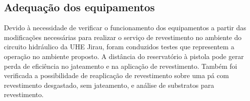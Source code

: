 \subsection{Adequação dos equipamentos}
Devido à necessidade de verificar o funcionamento dos equipamentos a partir das
modificações necessárias para realizar o serviço de revestimento no ambiente do
circuito hidráulico da UHE Jirau, foram conduzidos testes que representem a
operação no ambiente proposto. A distância do reservatório à pistola pode gerar
perda de eficiência no jateamento e na aplicação de revestimento. Também foi
verificada a possibilidade de reaplicação de revestimento sobre
uma pá com revestimento desgastado, sem jateamento, e análise de substratos
para revestimento.



